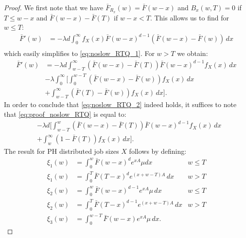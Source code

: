 \documentclass[12pt]{report}
\begin{document}
\begin{proof}
	We first note that we have $\bar F_{R_x}(w) = \bar F(w-x)$ and $B_x(w,T)=0$ if $T \leq w-x$ and $\bar F(w-x)-\bar F(T)$ if $w-x < T$. This allows us to find for $w \leq T$:
	\begin{align*}
		\bar F'(w)
		&=
		- \lambda d \int_0^{\infty} f_X(x) \bar F(w-x)^{d-1} \left(\bar F(w-x) - \bar F(w) \right) \, dx\\
	\end{align*}
	which easily simplifies to \eqref{eq:noslow_RTQ_1}. For $w > T$ we obtain:
	\begin{align}
		\bar F'(w)
		&=
		-\lambda d \int_{w-T}^{\infty} \left( \bar F(w-x) - \bar F(T) \right) \bar F(w-x) ^{d-1} f_X(x) \, dx \label{eq:proof_noslow_RTQ}\\
		&- \lambda \int_0^{\infty} \bigg[ \int_0^{w-T} \left( \bar F(w-x) - \bar F(w) \right) f_X(x) \, dx\nonumber\\
		&+ \int_{w-T} ^ {\infty} \left(\bar F(T) - \bar F(w) \right) f_X(x) \, dx \bigg]. \nonumber
	\end{align}
	In order to conclude that \eqref{eq:noslow_RTQ_2} indeed holds, it suffices to note that \eqref{eq:proof_noslow_RTQ} is equal to:
	\begin{align*}
		&-\lambda d \bigg[ \int_{w-T}^w \left( \bar F(w-x) - \bar F(T) \right) \bar F(w-x)^{d-1} f_X(x) \, dx\\
		& + \int_w^{\infty} (1-\bar F(T)) f_X(x) \, dx \bigg].
	\end{align*}
	The result for PH distributed job sizes $X$ follows by defining:
	\begin{align*}
		\xi_1(w) &= \int_0^w \bar F (w-x)^d e^{xA} \mu dx & w \leq T\\
		\xi_1(w) &= \int_0^T \bar F(T-x)^d e^{(x+w-T)A} \, dx & w > T\\
		\xi_2(w) &= \int_0^w \bar F(w-x)^{d-1} e^{xA} \mu \, dx & w \leq T\\
		\xi_2(w) &= \int_0^T \bar F(T-x)^{d-1} e^{(x+w-T) A} \, dx & w > T\\
		\xi_3(w) &= \int_0^{w-T} \bar F(w-x) e^{xA} \mu \, dx.
	\end{align*}
\end{proof}
\end{document}
